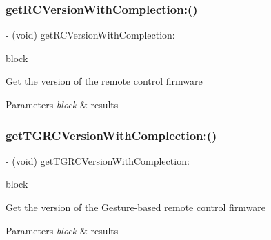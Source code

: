 \subsubsection{\texorpdfstring{get\+R\+C\+Version\+With\+Complection\+:()}{getRCVersionWithComplection:()}}
{\footnotesize\ttfamily -\/ (void) get\+R\+C\+Version\+With\+Complection\+: \begin{DoxyParamCaption}\item[{(void($^\wedge$)(float version, N\+S\+Error $\ast$\hyperlink{group___p_v_s_d_k___c_o_r_e___a_p_i___m_o_u_n_t_c_o_n_t_r_o_l_ga5a1de33b230662127568783314b4a54d}{\+\_\+\+Nullable} error))}]{block }\end{DoxyParamCaption}}

Get the version of the remote control firmware


\begin{DoxyParams}{Parameters}
{\em block} & results \\
\hline
\end{DoxyParams}
\mbox{\label{interface_p_v_remote_controller_a193b392793255c875f8e0cf13bc8e6e1}} 
\subsubsection{\texorpdfstring{get\+T\+G\+R\+C\+Version\+With\+Complection\+:()}{getTGRCVersionWithComplection:()}}
{\footnotesize\ttfamily -\/ (void) get\+T\+G\+R\+C\+Version\+With\+Complection\+: \begin{DoxyParamCaption}\item[{(void($^\wedge$)(float version, N\+S\+Error $\ast$\hyperlink{group___p_v_s_d_k___c_o_r_e___a_p_i___m_o_u_n_t_c_o_n_t_r_o_l_ga5a1de33b230662127568783314b4a54d}{\+\_\+\+Nullable} error))}]{block }\end{DoxyParamCaption}}

Get the version of the Gesture-\/based remote control firmware


\begin{DoxyParams}{Parameters}
{\em block} & results \\
\hline
\end{DoxyParams}
\mbox{\label{interface_p_v_remote_controller_ad6ef40ad9fb9954c155ee6a9366f2d1d}} 
